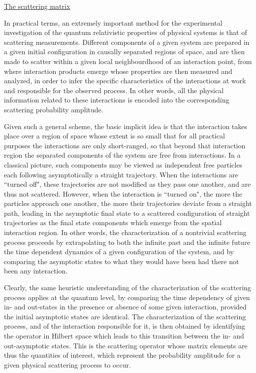 \documentclass[a4paper,11pt]{article}
\begin{document}
\noindent\underline{The scattering matrix}

\vspace{10pt}

In practical terms, an extremely important method for the experimental 
investigation of the quantum relativistic properties of physical systems is 
that of scattering measurements. Different components of a given system are
prepared in a given initial configuration in causally separated regions of
space, and are then made to scatter within a given local neighbourdhood of
an interaction point, from where interaction products emerge whose properties
are then measured and analyzed, in order to infer the specific characteristics
of the interactions at work and responsible for the observed process.
In other words, all the physical information related to these interactions
is encoded into the corresponding scattering probability amplitude.

Given such a general scheme, the basic implicit idea is that the interaction
takes place over a region of space whose extent is so small that for all
practical purposes the interactions are only short-ranged, so that beyond
that interaction region the separated components of the system are free
from interactions. In a classical picture, such components may be viewed as
independent free particles each following asymptotically a straight 
trajectory. When the interactions are ``turned off", these trajectories are 
not modified as they pass one another, and are thus not scattered. 
However, when the interaction is ``turned on", the more the particles 
approach one another, the more their trajectories deviate from a straight 
path, leading in the asymptotic final state to a scattered configuration of 
straight trajectories as the final state components which emerge from the 
spatial interaction region. In other words, the cha\-rac\-te\-ri\-za\-tion of a 
nontrivial scattering process proceeds by extrapolating to both the infinite 
past and the infinite future the time dependent dynamics of a given 
configuration of the system, and by comparing the asymptotic states to what 
they would have been had there not been any interaction.

Clearly, the same heuristic understanding of the characterization of the
scattering process applies at the quantum level, by comparing the time
dependency of given in- and out-states in the presence or absence of some
given interaction, provided the initial asymptotic states are identical. The 
characterization of the scattering process, and of the interaction 
responsible for it, is then obtained by identifying the operator in Hilbert 
space which leads to this transition between the in- and out-asymptotic 
states. This is the scattering operator \coordHE{} whose matrix elements are thus 
the quantities of interest, which represent the probability amplitude for 
a given physical scattering process to occur.
\end{document}
